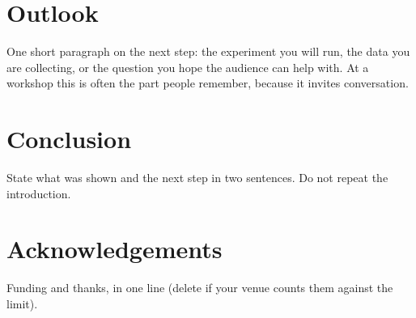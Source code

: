 \documentclass[10pt,a4paper,twocolumn]{article}
\begin{document}
\section{Outlook}
One short paragraph on the next step: the experiment you will run, the data you are
collecting, or the question you hope the audience can help with. At a workshop this is often
the part people remember, because it invites conversation.

\section{Conclusion}
State what was shown and the next step in two sentences. Do not repeat the introduction.

\section*{Acknowledgements}
Funding and thanks, in one line (delete if your venue counts them against the limit).

{\small
}
\end{document}
